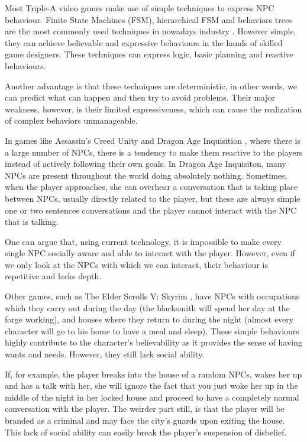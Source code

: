 Most Triple-A video games make use of simple techniques to express NPC behaviour.
Finite State Machines (FSM), hierarchical FSM and behaviors trees are the most commonly used techniques in nowadays industry \cite{yannakakis:gameairevisited}.
However simple, they can achieve believable and expressive behaviours in the hands of skilled game designers.
These techniques can express logic, basic planning and  reactive behaviours.

Another advantage is that these techniques are deterministic, in other words, we can predict what can happen and then try to avoid problems.
Their major weakness, however, is their limited expressiveness, which can cause the realization of complex behaviors unmanageable.

In games like Assassin's Creed Unity \cite{games:assassinscreedunity} and Dragon Age Inquisition \cite{games:dragonageinquisition}, where there is a large number of NPCs, there is a tendency to make them reactive to the players instead of actively following their own goals.
In Dragon Age Inquisiton, many NPCs are present throughout the world doing absolutely nothing.
Sometimes, when the player approaches, she can overhear a conversation that is taking place between NPCs, usually directly related to the player, but these are always simple one or two sentences conversations and the player cannot interact with the NPC that is talking.

One can argue that, using current technology, it is impossible to make every single NPC socially aware and able to interact with the player.
However, even if we only look at the NPCs with which we can interact, their behaviour is repetitive and lacks depth.

Other games, such as The Elder Scrolls V: Skyrim \cite{games:skyrim}, have NPCs with occupations which they carry out during the day (the blacksmith will spend her day at the forge working), and houses where they return to during the night (almost every character will go to his home to have a meal and sleep).
These simple behaviours highly contribute to the character's believability as it provides the sense of having wants and needs. However, they still lack social ability.

If, for example, the player breaks into the house of a random NPCs, wakes her up and has a talk with her, she will ignore the fact that you just woke her up in the middle of the night in her locked house and proceed to have a completely normal conversation with the player.
The weirder part still, is that the player will be branded as a criminal and may face the city's guards upon exiting the house.
This lack of social ability can easily break the player's suspension of disbelief.


